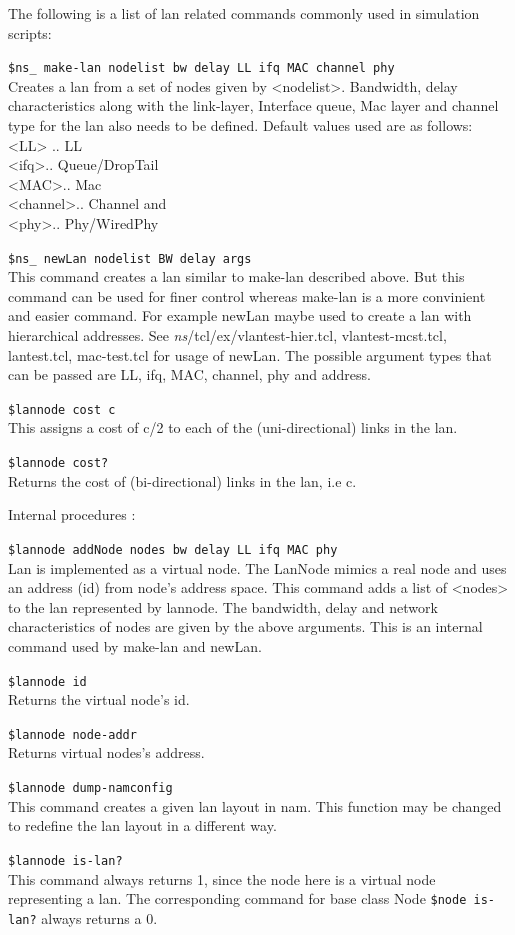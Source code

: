 The following is a list of lan related commands commonly used in
simulation scripts:
\begin{flushleft}
{\tt \$ns\_ make-lan  \<nodelist\> \<bw\> \<delay\> \<LL\> \<ifq\> \<MAC\> \<channel\> \<phy\>}\\
Creates a lan from a set of nodes given by <nodelist>. Bandwidth, delay characteristics
along with the link-layer, Interface queue, Mac layer and channel type for the
lan also needs to be defined. Default values used are as follows:\\
<LL> .. LL\\
<ifq>.. Queue/DropTail\\
<MAC>.. Mac\\
<channel>.. Channel and \\
<phy>.. Phy/WiredPhy


{\tt \$ns\_ newLan \<nodelist\> \<BW\> \<delay\> \<args\>}\\
This command creates a lan similar to make-lan described above. But this
command can be used for finer control whereas make-lan is a more convinient and
easier command. For example newLan maybe used to create a lan with hierarchical
addresses. See \emph{ns}/tcl/ex/{vlantest-hier.tcl, vlantest-mcst.tcl, lantest.tcl,
mac-test.tcl} for usage of newLan. The possible argument types that can be
passed are LL, ifq, MAC, channel, phy and address.


{\tt \$lannode cost \<c\>}\\
This assigns a cost of c/2 to each of the (uni-directional) links in the lan.


{\tt \$lannode cost?}\\
Returns the cost of (bi-directional) links in the lan, i.e c.


Internal procedures :

{\tt \$lannode addNode \<nodes\> \<bw\> \<delay\> \<LL\> \<ifq\> \<MAC\> \<phy\>}\\
Lan is implemented as a virtual node. The LanNode mimics a real node and uses
an address (id) from node's address space.
This command adds a list of <nodes> to the lan represented by lannode.
The bandwidth, delay and network characteristics of nodes are given by
the above arguments. This is an internal command used by make-lan and newLan.


{\tt \$lannode id}\\
Returns the virtual node's id.


{\tt \$lannode node-addr}\\
Returns virtual nodes's address.


{\tt \$lannode dump-namconfig}\\
This command creates a given lan layout in nam. This function may be changed
to redefine the lan layout in a different way.


{\tt \$lannode is-lan?}\\
This command always returns 1, since the node here is a virtual node
representing a lan. The corresponding command for base class Node 
{\tt \$node is-lan?} always returns a 0.

\end{flushleft}

\endinput



